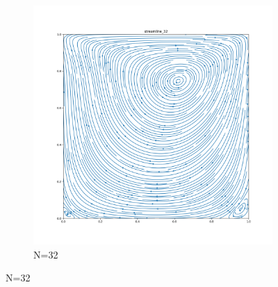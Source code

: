 \documentclass[12pt]{article}
\begin{document}
\begin{figure}[H]
\begin{subfigure}[b]{0.48\linewidth}
        \includegraphics[width=\linewidth]{figures/Re=100_result/streamline_32.png}
        \caption{N=32}
    \end{subfigure}
    

\end{figure}
\end{document}
